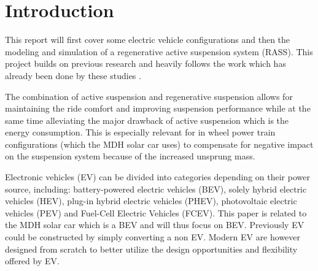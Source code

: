 \section{Introduction}
\label{section:intro}

This report will first cover some electric vehicle configurations and then the modeling and simulation of a regenerative active suspension system (RASS). This project builds on previous research and heavily follows the work which has already been done by these studies\:\cite{azmiNovelOptimalControl2023} \cite{liuTransmissionEnergyharvestingStudy2021}\cite{liuModelingSimulationEnergyRegenerative2019}\cite{zhengNovelEnergyregenerativeActive2008}\cite{yinPerformanceEvaluationActive2015}\cite{okadaEnergyRegenerativeActive2007}\cite{liuModellingExperimentalStudy2016}. 

The combination of active suspension and regenerative suspension allows for maintaining the ride comfort and improving suspension performance while at the same time alleviating the major drawback of active suspension which is the energy consumption\:\cite{azmiNovelOptimalControl2023}\cite{liuTransmissionEnergyharvestingStudy2021}\cite{yinPerformanceEvaluationActive2015}. This is especially relevant for in wheel power train configurations (which the MDH solar car uses) to compensate for negative impact on the suspension system because of the increased unsprung mass\:\cite{yinPerformanceEvaluationActive2015}.




Electronic vehicles (EV) can be divided into categories depending on their power source, including: battery-powered electric vehicles (BEV), solely hybrid electric vehicles (HEV), plug-in hybrid electric vehicles (PHEV), photovoltaic electric vehicles (PEV) and Fuel-Cell Electric Vehicles (FCEV)\:\cite{hannanStateoftheArtEnergyManagement2018}\cite{khajepourElectricHybridVehicles2014}\cite{un-noorComprehensiveStudyKey2017}.
This paper is related to the MDH solar car which is a BEV and will thus focus on BEV.
Previously EV could be constructed by simply converting a non EV\:\cite{chauEVPowertrainConfigurations2014}. Modern EV are however designed from scratch to better utilize the design opportunities and flexibility offered by EV\:\cite{chauEVPowertrainConfigurations2014}\cite{othaganontMultiobjectiveOptimisationBattery2017}.

